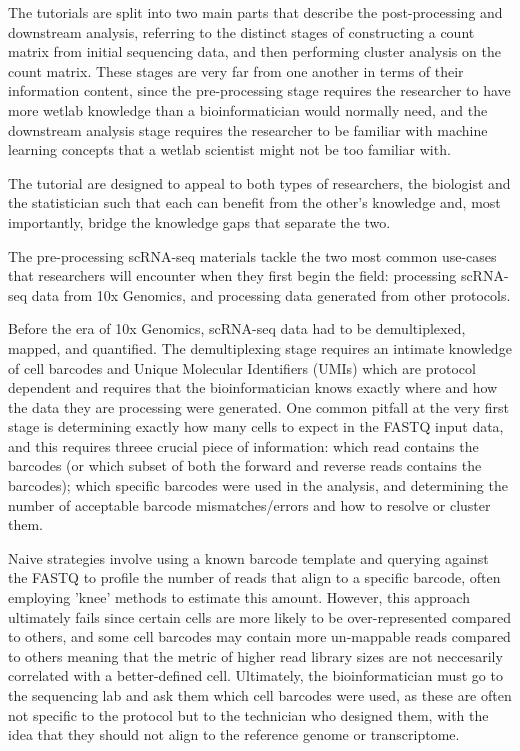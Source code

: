 \documentclass[a4paper,num-refs]{oup-contemporary}
\begin{document}
The tutorials are split into two main parts that describe the post-processing and downstream analysis, referring to the distinct stages of constructing a count matrix from initial sequencing data, and then performing cluster analysis on the count matrix. These stages are very far from one another in terms of their information content, since the pre-processing stage requires the researcher to have more wetlab knowledge than a bioinformatician would normally need, and the downstream analysis stage requires the researcher to be familiar with machine learning concepts that a wetlab scientist might not be too familiar with.

The tutorial are designed to appeal to both types of researchers, the biologist and the statistician such that each can benefit from the other's knowledge and, most importantly, bridge the knowledge gaps that separate the two.

The pre-processing scRNA-seq materials tackle the two most common use-cases that researchers will encounter when they first begin the field: processing scRNA-seq data from 10x Genomics, and processing data generated from other protocols.

Before the era of 10x Genomics, scRNA-seq data had to be demultiplexed, mapped, and quantified. The demultiplexing stage requires an intimate knowledge of cell barcodes and Unique Molecular Identifiers (UMIs) which are protocol dependent and requires that the bioinformatician knows exactly where and how the data they are processing were generated. One common pitfall at the very first stage is determining exactly how many cells to expect in the FASTQ input data, and this requires threee crucial piece of information: which read contains the barcodes (or which subset of both the forward and reverse reads contains the barcodes); which specific barcodes were used in the analysis, and determining the number of acceptable barcode mismatches/errors and how to resolve or cluster them.

Naive strategies involve using a known barcode template and querying against the FASTQ to profile the number of reads that align to a specific barcode, often employing 'knee' methods to estimate this amount. However, this approach ultimately fails since certain cells are more likely to be over-represented compared to others, and some cell barcodes may contain more un-mappable reads compared to others meaning that the metric of higher read library sizes are not neccesarily correlated with a better-defined cell. Ultimately, the bioinformatician must go to the sequencing lab and ask them which cell barcodes were used, as these are often not specific to the protocol but to the technician who designed them, with the idea that they should not align to the reference genome or transcriptome.
\end{document}
